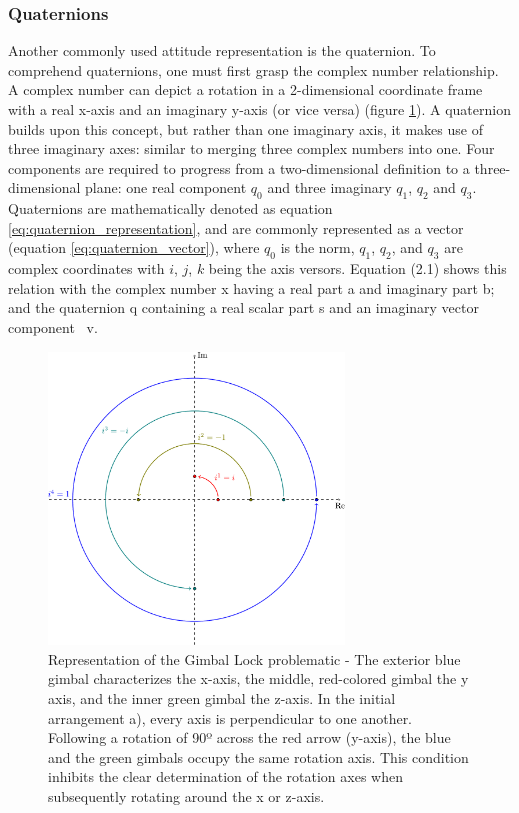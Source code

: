 \subsubsection{Quaternions}

Another commonly used attitude representation is the quaternion. To comprehend quaternions, one must first grasp the complex number relationship. A complex number can depict a rotation in a 2-dimensional coordinate frame with a real x-axis and an imaginary y-axis (or vice versa) (figure \ref{fig:complex_rotation}). A quaternion builds upon this concept, but rather than one imaginary axis, it makes use of three imaginary axes: similar to merging three complex numbers into one. Four components are required to progress from a two-dimensional definition to a three-dimensional plane: one real component $q_0$ and three imaginary $q_1$, $q_2$ and $q_3$. Quaternions are mathematically denoted as equation \ref{eq:quaternion_representation}, and are commonly represented as a vector (equation \ref{eq:quaternion_vector}), where $q_0$ is the norm, $q_1$, $q_2$, and $q_3$ are complex coordinates with $i$, $j$, $k$ being the axis versors. Equation (2.1) shows this relation with the complex number x having a real part a and imaginary part b; and the quaternion q containing a real scalar part s and an imaginary vector component ~v.

\begin{figure}[!h]
    \centering
    \includegraphics[width=0.7\textwidth]{figures/complex_rotation.pdf}
    \caption{Representation of the Gimbal Lock problematic \cite{zeitlhofler2019nominal} - The exterior blue gimbal characterizes the x-axis, the middle, red-colored gimbal the y axis, and the inner green gimbal the z-axis. In the initial arrangement a), every axis is perpendicular to one another. Following a rotation of 90º across the red arrow (y-axis), the blue and the green gimbals occupy the same rotation axis. This condition inhibits the clear determination of the rotation axes when subsequently rotating around the x or z-axis. }
    \label{fig:complex_rotation}
\end{figure}

